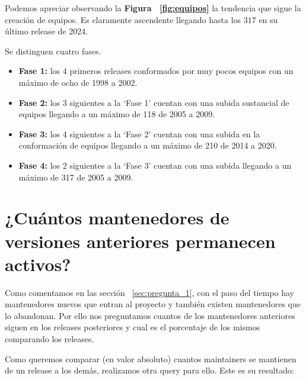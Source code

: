 \documentclass[a4paper, 12pt]{book}
\begin{document}
Podemos apreciar observando la \textbf{Figura ~\ref{fig:equipos}} la tendencia que sigue la creación de equipos. Es claramente ascendente llegando hasta los 317 en su último release de 2024.

Se distinguen cuatro fases.
\begin{itemize}
	\item  \textbf{Fase 1:} los 4 primeros releases conformados por muy pocos equipos con un máximo de ocho de 1998 a 2002. 
	
	\item  \textbf{Fase 2:} los 3 siguientes a la `Fase 1' cuentan con una subida sustancial de equipos llegando a un máximo de 118 de 2005 a 2009.
	
	\item  \textbf{Fase 3:} los 4 siguientes a la `Fase 2' cuentan con una subida en la conformación de equipos llegando a un máximo de 210 de 2014 a 2020.
	
	\item  \textbf{Fase 4:} los 2 siguientes a la `Fase 3' cuentan con una subida  llegando a un máximo de 317 de 2005 a 2009.
	
\end{itemize}

\section{¿Cuántos mantenedores de versiones anteriores permanecen activos?}
\label{sec:pregunta_3}

Como comentamos en las sección ~\ref{sec:pregunta_1}, con el paso del tiempo hay mantenedores nuevos que entran al proyecto y también existen mantenedores que lo abandonan. Por ello nos preguntamos cuantos de los mantenedores anteriores siguen en los releases posteriores y cual es el porcentaje de los mismos comparando los releases.



Como queremos comparar (en valor absoluto) cuantos maintainers se mantienen de un release a los demás, realizamos otra query para ello.
Este es su resultado:
	

	
		
\end{document}
